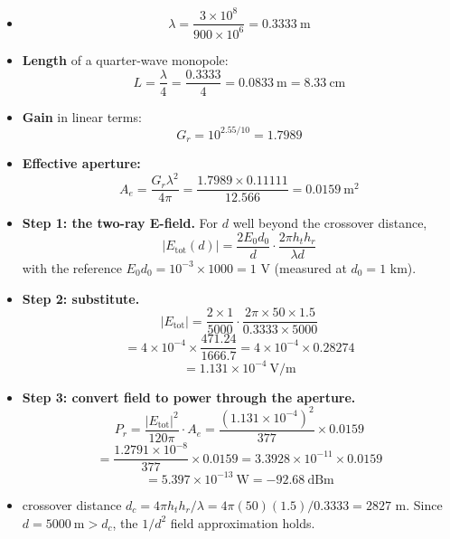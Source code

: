 \begin{itemize}
  \item \[ \lambda = \frac{3\times10^{8}}{900\times10^{6}} = 0.3333\ \text{m} \]
  \item \textbf{Length} of a quarter-wave monopole:
        \[ L = \frac{\lambda}{4} = \frac{0.3333}{4} = \boxed{0.0833\ \text{m} = 8.33\ \text{cm}} \]
  \item \textbf{Gain} in linear terms:
        \[ G_r = 10^{2.55/10} = 1.7989 \]
  \item \textbf{Effective aperture:}
        \[ A_e = \frac{G_r \lambda^2}{4\pi} = \frac{1.7989 \times 0.11111}{12.566}
               = \boxed{0.0159\ \text{m}^2} \]
\end{itemize}

\begin{itemize}
  \item \textbf{Step 1: the two-ray E-field.} For $d$ well beyond the crossover distance,
        \[ |E_{\text{tot}}(d)| = \frac{2 E_0 d_0}{d} \cdot \frac{2\pi h_t h_r}{\lambda d} \]
        with the reference $E_0 d_0 = 10^{-3} \times 1000 = 1$ V (measured at $d_0 = 1$ km).
  \item \textbf{Step 2: substitute.}
        \[ |E_{\text{tot}}| = \frac{2 \times 1}{5000}
           \cdot \frac{2\pi \times 50 \times 1.5}{0.3333 \times 5000} \]
        \[ = 4\times10^{-4} \times \frac{471.24}{1666.7}
          = 4\times10^{-4} \times 0.28274 \]
        \[ = \boxed{1.131\times10^{-4}\ \text{V/m}} \]
  \item \textbf{Step 3: convert field to power through the aperture.}
        \[ P_r = \frac{|E_{\text{tot}}|^2}{120\pi} \cdot A_e
               = \frac{(1.131\times10^{-4})^2}{377} \times 0.0159 \]
        \[ = \frac{1.2791\times10^{-8}}{377} \times 0.0159
          = 3.3928\times10^{-11} \times 0.0159 \]
        \[ = \boxed{5.397\times10^{-13}\ \text{W} = -92.68\ \text{dBm}} \]
  \item {} crossover distance
        $d_c = 4\pi h_t h_r/\lambda = 4\pi(50)(1.5)/0.3333 = 2827$ m.
        Since $d = 5000\ \text{m} > d_c$, the $1/d^2$ field approximation holds. \checkmark
\end{itemize}

\hr

{\color{sub}\footnotesize {} }

